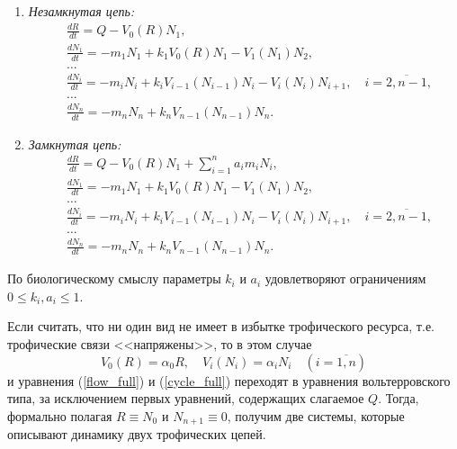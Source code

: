     \begin{enumerate}[label={\asbuk*)}, ref=\asbuk*]
        \item \textit{Незамкнутая цепь:}
        \begin{equation}  \label{flow_full}
            \begin{split}
                & \frac{dR}{dt} = Q - V_0(R) N_1, \\
                & \frac{dN_1}{dt} = -m_1 N_1 + k_1 V_0(R) N_1 - V_1(N_1) N_2, \\
                & \dots \\
                & \frac{dN_i}{dt} = -m_i N_i + k_i V_{i-1}(N_{i-1}) N_i - V_i(N_i) N_{i+1}, \quad i=\overline{2,n-1}, \\
                & \dots \\
                & \frac{dN_n}{dt} = -m_n N_n + k_n V_{n-1}(N_{n-1}) N_n.
            \end{split}
        \end{equation}

        \item \textit{Замкнутая цепь:}
        \begin{equation} \label{cycle_full}
            \begin{split}
                & \frac{dR}{dt} = Q - V_0(R) N_1  + \sum_{i=1}^{n} a_i m_i N_i, \\
                & \frac{dN_1}{dt} = -m_1 N_1 + k_1 V_0(R) N_1 - V_1(N_1) N_2, \\
                & \dots \\
                & \frac{dN_i}{dt} = -m_i N_i + k_i V_{i-1}(N_{i-1}) N_i - V_i(N_i) N_{i+1}, \quad i=\overline{2,n-1}, \\
                & \dots \\
                & \frac{dN_n}{dt} = -m_n N_n + k_n V_{n-1}(N_{n-1}) N_n.
            \end{split}
        \end{equation}
    \end{enumerate}

    По биологическому смыслу параметры $k_i$ и $a_i$ удовлетворяют ограничениям $ 0 \leq k_i, a_i \leq 1 $.

    Если считать, что ни один вид не имеет в избытке трофического ресурса, т.е. трофические связи <<напряжены>>, то в этом случае
    \begin{equation}
        V_0(R) = \alpha_0 R, \quad V_i(N_i) = \alpha_i N_i \quad (i=\overline{1,n})
    \end{equation}
    и уравнения (\ref{flow_full}) и (\ref{cycle_full}) переходят в уравнения вольтерровского типа, за исключением первых уравнений, содержащих слагаемое \(Q\). Тогда, формально полагая \(R \equiv N_0\) и \( N_{n+1} \equiv 0 \), получим две системы, которые описывают динамику двух трофических цепей.  

